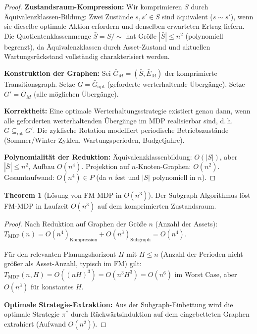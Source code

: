 ﻿\documentclass[a4paper,12pt]{article}
\theoremstyle{definition}
\newtheorem{theorem}{Theorem}[section]
\begin{document}
\begin{proof}
\textbf{Zustandsraum-Kompression:}
Wir komprimieren $S$ durch Äquivalenzklassen-Bildung:
Zwei Zustände $s, s' \in S$ sind äquivalent ($s \sim s'$), wenn sie dieselbe
optimale Aktion erfordern und denselben erwarteten Ertrag liefern.
Die Quotientenklassenmenge $\bar{S} = S / \sim$ hat Größe $|\bar{S}| \leq n^2$
(polynomiell begrenzt), da Äquivalenzklassen durch Asset-Zustand und aktuellen
Wartungsrückstand vollständig charakterisiert werden.

\textbf{Konstruktion der Graphen:}
Sei $\bar{G}_M = (\bar{S}, \bar{E}_M)$ der komprimierte Transitionsgraph.
Setze $G = \bar{G}_{\mathrm{opt}}$ (geforderte werterhaltende Übergänge).
Setze $G' = \bar{G}_M$ (alle möglichen Übergänge).

\textbf{Korrektheit:}
Eine optimale Werterhaltungsstrategie existiert genau dann, wenn alle geforderten
werterhaltenden Übergänge im MDP realisierbar sind, d.\,h.\ $G \subseteq_{\mathrm{rot}} G'$.
Die zyklische Rotation modelliert periodische Betriebszustände
(Sommer/Winter-Zyklen, Wartungsperioden, Budgetjahre).

\textbf{Polynomialität der Reduktion:}
Äquivalenzklassenbildung: $O(|S|)$, aber $|\bar{S}| \leq n^2$, Aufbau $O(n^4)$.
Projektion auf $n$-Knoten-Graphen: $O(n^2)$.
Gesamtaufwand: $O(n^4) \in P$ (da $n$ fest und $|S|$ polynomiell in $n$).
\end{proof}

\begin{theorem}[Lösung von FM-MDP in $O(n^3)$]
\label{thm:mdp-sol}
Der Subgraph Algorithmus löst FM-MDP in Laufzeit $O(n^3)$ auf dem komprimierten
Zustandsraum.
\end{theorem}

\begin{proof}
Nach Reduktion auf Graphen der Größe $n$ (Anzahl der Assets):
$T_{\mathrm{MDP}}(n) = O(n^4)_{\mathrm{Kompression}} + O(n^3)_{\mathrm{Subgraph}} = O(n^4)$.

Für den relevanten Planungshorizont $H$ mit $H \leq n$ (Anzahl der Perioden
nicht größer als Asset-Anzahl, typisch im FM) gilt:
$T_{\mathrm{MDP}}(n, H) = O((nH)^3) = O(n^3 H^3) = O(n^6)$ im Worst Case,
aber $O(n^3)$ für konstantes $H$.

\textbf{Optimale Strategie-Extraktion:}
Aus der Subgraph-Einbettung wird die optimale Strategie $\pi^*$ durch
Rückwärtsinduktion auf dem eingebetteten Graphen extrahiert (Aufwand $O(n^2)$).
\end{proof}
\end{document}
